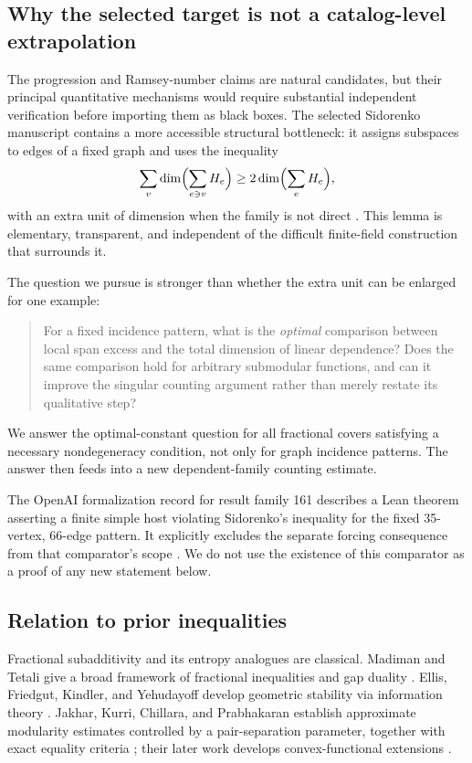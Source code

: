 \documentclass[11pt]{article}
\theoremstyle{definition}
\theoremstyle{remark}
\newcommand{\1}{\mathbf 1}
\newcommand{\src}[1]{\texttt{\detokenize{#1}}}
\begin{document}
\subsection{Why the selected target is not a catalog-level extrapolation}

The progression and Ramsey-number claims are natural candidates, but their
principal quantitative mechanisms would require substantial independent
verification before importing them as black boxes. The selected Sidorenko
manuscript contains a more accessible structural bottleneck: it assigns
subspaces to edges of a fixed graph and uses the inequality
\begin{equation}
 \sum_v\dim\Bigl(\sum_{e\ni v}H_e\Bigr)
 \ge 2\dim\Bigl(\sum_e H_e\Bigr),
 \label{eq:sourceweak}
\end{equation}
with an extra unit of dimension when the family is not direct
\cite[\src{sections/tail.tex}, \src{lem:tail-span}]{OpenAISidorenko}.
This lemma is elementary, transparent, and independent of the difficult
finite-field construction that surrounds it.

The question we pursue is stronger than whether the extra unit can be enlarged
for one example:
\begin{quote}
For a fixed incidence pattern, what is the \emph{optimal} comparison between
local span excess and the total dimension of linear dependence? Does the same
comparison hold for arbitrary submodular functions, and can it improve the
singular counting argument rather than merely restate its qualitative step?
\end{quote}
We answer the optimal-constant question for all fractional covers satisfying a
necessary nondegeneracy condition, not only for graph incidence patterns. The
answer then feeds into a new dependent-family counting estimate.

The OpenAI formalization record for result family 161 describes a Lean theorem
asserting a finite simple host violating Sidorenko's inequality for the fixed
35-vertex, 66-edge pattern. It explicitly excludes the separate forcing
consequence from that comparator's scope \cite{OpenAILean161}. We do not use the
existence of this comparator as a proof of any new statement below.

\subsection{Relation to prior inequalities}

Fractional subadditivity and its entropy analogues are classical. Madiman and
Tetali give a broad framework of fractional inequalities and gap duality
\cite{MadimanTetali}. Ellis, Friedgut, Kindler, and Yehudayoff develop geometric
stability via information theory \cite{EllisEtAl}. Jakhar, Kurri, Chillara, and
Prabhakaran establish approximate modularity estimates controlled by a
pair-separation parameter, together with exact equality criteria
\cite{Jakhar2025}; their later work develops convex-functional extensions
\cite{Jakhar2026}.
\end{document}
